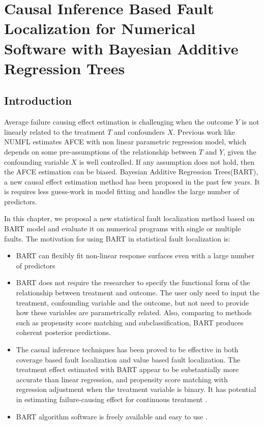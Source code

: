\chapter{Causal Inference Based Fault Localization for Numerical Software with Bayesian Additive Regression Trees}\label{chap:BART}


\section{Introduction}\label{BARTintro}
\vspace{-2pt}
Average failure causing effect estimation is challenging when the outcome $Y$ is not linearly related to the treatment $T$ and confounders $X$. Previous work like NUMFL estimates AFCE with non linear parametric regression model, which depends on some pre-assumptions of the relationship between $T$ and $Y$, given the confounding variable $X$ is well controlled.  If any assumption does not hold, then the AFCE estimation can be biased. Bayesian Additive Regression Trees(BART), a new causal effect estimation method has been proposed in the past few years. It is requires less guess-work in model fitting and handles the large number of predictors.
  
In this chapter, we proposal a new statistical fault localization method based on BART model and evaluate it on numerical programs with single or multiple faults. The motivation for using BART in statistical fault localization is:
\vspace{-0.2cm}
\begin{itemize}
\item BART can flexibly fit non-linear response surfaces even with a large number of predictors
\item BART does not require the researcher to specify the functional form of the relationship between treatment and outcome. The user only need to input the treatment, confounding variable and the outcome, but not need to provide how these variables are parametrically related. Also, comparing to methods such as propensity score matching and subclassification, BART produces coherent posterior predictions.
\item The casual inference techniques has been proved to be effective in both coverage based fault localization and value based fault localization. The treatment effect estimated with BART appear to be substantially more accurate than linear regression, and propensity score matching with regression adjustment when the treatment variable is binary. It has potential in estimating failure-causing effect for continuous treatment \cite{}.
\item BART algorithm software is freely available and easy to use \cite{}.
\end{itemize}

